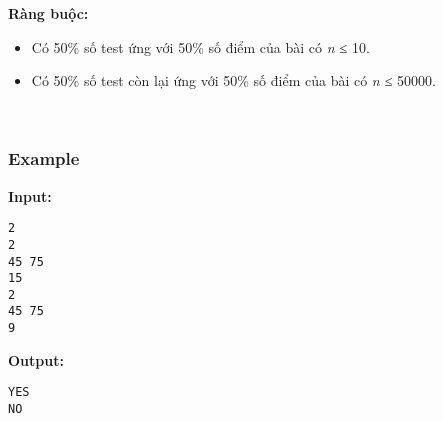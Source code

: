 \textbf{Ràng buộc:}
\begin{itemize}
	\item Có 50\% số test ứng với 50\% số điểm của bài có \emph{ n ≤ } 10.
	\item Có 50\% số test còn lại ứng với 50\% số điểm của bài có \emph{ n ≤ } 50000.
\end{itemize}

 

\subsubsection{Example}

\textbf{Input: }
\begin{verbatim}
2
2
45 75
15
2
45 75
9\end{verbatim}

\textbf{Output: }
\begin{verbatim}
YES
NO\end{verbatim}